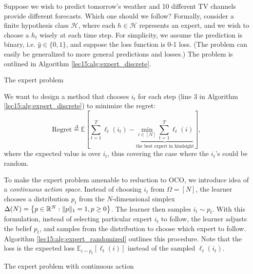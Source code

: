 Suppose we wish to predict tomorrow's weather and 10 different TV channels provide different forecasts. Which one should we follow? Formally, consider a finite hypothesis class $\mathcal{H}$, where each $h \in \mathcal{H}$ represents an expert, and we wish to choose a $h_t$ wisely at each time step. For simplicity, we assume the prediction is binary, i.e. $\hat{y} \in \{0, 1\}$, and suppose the loss function is 0-1 loss. (The problem can easily be generalized to more general predictions and losses.) The problem is outlined in Algorithm \ref{lec15:alg:expert_discrete}.

\begin{algorithm}[h]
\caption{The expert problem}
\label{lec15:alg:expert_discrete}
\end{algorithm}

We want to design a method that chooses $i_t$ for each step (line 3 in Algorithm \ref{lec15:alg:expert_discrete}) to minimize the regret:
\begin{equation}
\text{Regret} \overset{\Delta}{=} \mathbb{E}\left[
\sum_{t=1}^T \ell_t(i_t)
- \underbrace{\min_{i \in [N]} \sum_{t=1}^T \ell_t(i)}_\text{the best expert in hindsight}
\right],
\end{equation}
where the expected value is over $i_t$, thus covering the case where the $i_t$'s could be random.
    
To make the expert problem amenable to reduction to OCO, we introduce idea of a \textit{continuous action space}. Instead of choosing $i_t$ from $\Omega = [N]$, the learner chooses a distribution $p_t$ from the $N$-dimensional simplex $\Delta(N) = \left\{p \in \mathbb R^N : \|p\|_1 = 1, p \geq 0 \right\}$. The learner then samples $i_t \sim p_t$. With this formulation, instead of selecting particular expert $i_t$ to follow, the learner adjusts the belief $p_t$, and samples from the distribution to choose which expert to follow. Algorithm \ref{lec15:alg:expert_randomized} outlines this procedure. Note that the loss is the expected loss $\mathbb{E}_{i \sim p_t}[\ell_t(i)]$ instead of the sampled $\ell_t(i_t)$.

\begin{algorithm}
\caption{The expert problem with continuous action}
\label{lec15:alg:expert_randomized}
\end{algorithm}
    
